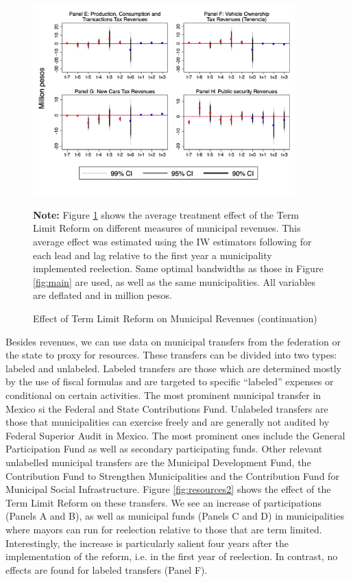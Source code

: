 \documentclass[12pt]{amsart}
\numberwithin{equation}{section}
\theoremstyle{definition}
\theoremstyle{definition}
\theoremstyle{definition}
\begin{document}
\begin{figure}[h]   
\centering
 \caption{Effect of Term Limit Reform on Municipal Revenues (continuation)}
 \label{fig:revenues2}
\includegraphics[width=0.9\textwidth]{../Figures_incumbency/revenues_allyears2.png}
       \captionsetup{justification=centering}
         
 \textbf{Note:} Figure \ref{fig:revenues2} shows the average treatment effect of the Term Limit Reform on different measures of municipal revenues. This average effect was estimated using the IW estimators following \citet{abraham_sun_2020} for each lead and lag relative to the first year a municipality implemented reelection. Same optimal bandwidths as those in Figure \ref{fig:main} are used, as well as the same municipalities. All variables are deflated and in million pesos.  
          
\end{figure}  

 Besides revenues, we can use data on municipal transfers from the federation or the state to proxy for resources. These transfers can be divided into two types: labeled and unlabeled. Labeled transfers are those which are determined mostly by the use of fiscal formulas and are targeted to specific ``labeled'' expenses or conditional on certain activities. The most prominent municipal transfer in Mexico si the Federal and State Contributions Fund. Unlabeled transfers are those that municipalities can exercise freely and are generally not audited by Federal Superior Audit in Mexico. The most prominent ones include the General Participation Fund as well as secondary participating funds. Other relevant unlabelled municipal transfers are the Municipal Development Fund, the Contribution Fund to Strengthen Municipalities and the Contribution Fund for Municipal Social Infrastructure. Figure \ref{fig:resources2} shows the effect of the Term Limit Reform on these transfers. We see an increase of participations (Panels A and B), as well as municipal funds (Panels C and D) in municipalities where mayors can run for reelection relative to those that are term limited. Interestingly, the increase is particularly salient four years after the implementation of the reform, i.e. in the first year of reelection. In contrast, no effects are found for labeled transfers (Panel F). 
   
\end{document}
